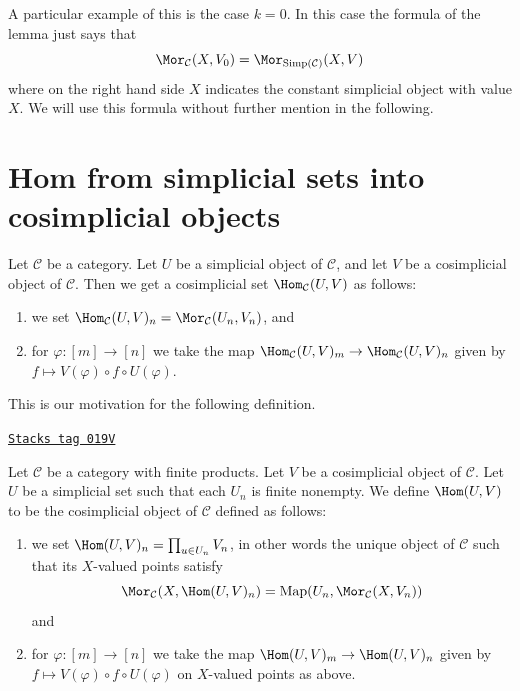 A particular example of this is the case $k = 0$.
In this case the formula of the lemma just says
that
$$
\Mor_\mathcal{C}(X, V_0)
=
\Mor_{\text{Simp}(\mathcal{C})}(X, V)
$$
where on the right hand side $X$ indicates the
constant simplicial object with value $X$. We will
use this formula without further mention in the
following.

\section{Hom from simplicial sets into cosimplicial objects}
\label{simplicial-section-hom-from-simplicial-sets-into-cosimplicial}
Let $\mathcal{C}$ be a category.
Let $U$ be a simplicial object of $\mathcal{C}$,
and let $V$ be a cosimplicial object of $\mathcal{C}$.
Then we get a cosimplicial set $\Hom_\mathcal{C}(U, V)$
as follows:
\begin{enumerate}
\item we set
$\Hom_\mathcal{C}(U, V)_n = \Mor_\mathcal{C}(U_n, V_n)$, and
\item for $\varphi : [m] \to [n]$ we take the map
$\Hom_\mathcal{C}(U, V)_m \to \Hom_\mathcal{C}(U, V)_n$
given by $f \mapsto V(\varphi) \circ f \circ U(\varphi)$.
\end{enumerate}
This is our motivation for the following definition.

\begin{definition}
\label{simplicial-definition-hom-deltak-cosimplicial}
\href{https://stacks.math.columbia.edu/tag/019V}{\texttt{Stacks tag 019V}}

Let $\mathcal{C}$ be a category with finite products.
Let $V$ be a cosimplicial object of $\mathcal{C}$.
Let $U$ be a simplicial set such that each
$U_n$ is finite nonempty.
We define {\it $\Hom(U, V)$} to be
the cosimplicial object of $\mathcal{C}$ defined
as follows:
\begin{enumerate}
\item we set $\Hom(U, V)_n = \prod_{u \in U_n} V_n$,
in other words the unique object of $\mathcal{C}$ such
that its $X$-valued points satisfy
$$
\Mor_\mathcal{C}(X, \Hom(U, V)_n)
=
\text{Map}(U_n, \Mor_\mathcal{C}(X, V_n))
$$
and
\item for $\varphi : [m] \to [n]$ we take the map
$\Hom(U, V)_m \to \Hom(U, V)_n$
given by $f \mapsto V(\varphi) \circ f \circ U(\varphi)$
on $X$-valued points as above.
\end{enumerate}
\end{definition}

